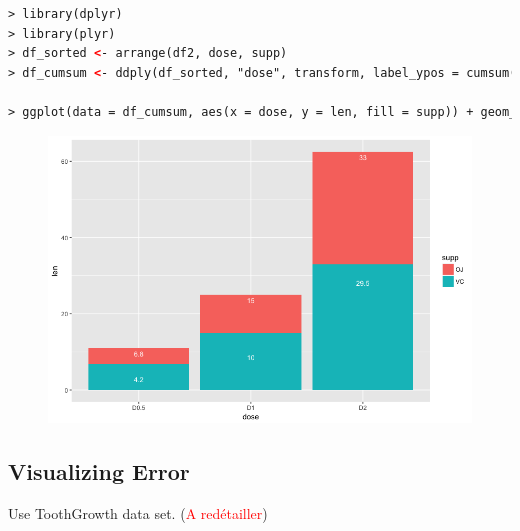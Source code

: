 \begin{lstlisting}[language=html]
> library(dplyr)
> library(plyr)
> df_sorted <- arrange(df2, dose, supp)
> df_cumsum <- ddply(df_sorted, "dose", transform, label_ypos = cumsum(len))

> ggplot(data = df_cumsum, aes(x = dose, y = len, fill = supp)) + geom_bar(stat = "identity") + geom_text(aes(label = len, y = label_ypos), vjust = 1.6, color = "white", size = 3.5)
\end{lstlisting}
\begin{figure}[H]\begin{center}\includegraphics[scale=1 ]{ilu/bg136.png}\end{center}\end{figure}

\subsection{Visualizing Error}
Use ToothGrowth data set. (\textcolor{red}{A redétailler})

